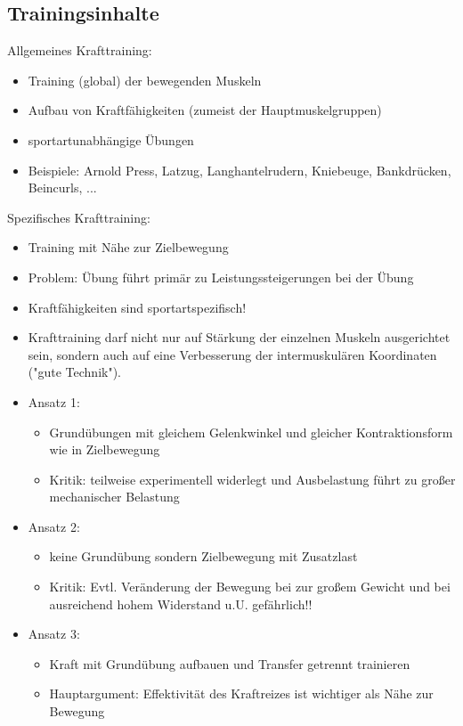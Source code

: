 \subsection{Trainingsinhalte}

Allgemeines Krafttraining:
\begin{itemize}
    \item Training (global) der bewegenden Muskeln
    \item Aufbau von Kraftfähigkeiten (zumeist der Hauptmuskelgruppen)
    \item sportartunabhängige Übungen
    \item Beispiele: Arnold Press, Latzug, Langhantelrudern, Kniebeuge, Bankdrücken, Beincurls, ...
\end{itemize}

Spezifisches Krafttraining:
\begin{itemize}
    \item Training mit Nähe zur Zielbewegung
    \item Problem: Übung führt primär zu Leistungssteigerungen bei der Übung
    \item Kraftfähigkeiten sind sportartspezifisch!
    \item Krafttraining darf nicht nur auf Stärkung der einzelnen Muskeln ausgerichtet sein, sondern auch auf eine Verbesserung der intermuskulären Koordinaten ("gute Technik").
    \item Ansatz 1:
    \begin{itemize}
        \item Grundübungen mit gleichem Gelenkwinkel und gleicher Kontraktionsform wie in Zielbewegung
        \item Kritik: teilweise experimentell widerlegt und Ausbelastung führt zu großer mechanischer Belastung
    \end{itemize}
    \item Ansatz 2:
    \begin{itemize}
        \item keine Grundübung sondern Zielbewegung mit Zusatzlast
        \item Kritik: Evtl. Veränderung der Bewegung bei zur großem Gewicht und bei ausreichend hohem Widerstand u.U. gefährlich!!
    \end{itemize}
    \item Ansatz 3:
    \begin{itemize}
        \item Kraft mit Grundübung aufbauen und Transfer getrennt trainieren
        \item Hauptargument: Effektivität des Kraftreizes ist wichtiger als Nähe zur Bewegung
    \end{itemize}
\end{itemize}

